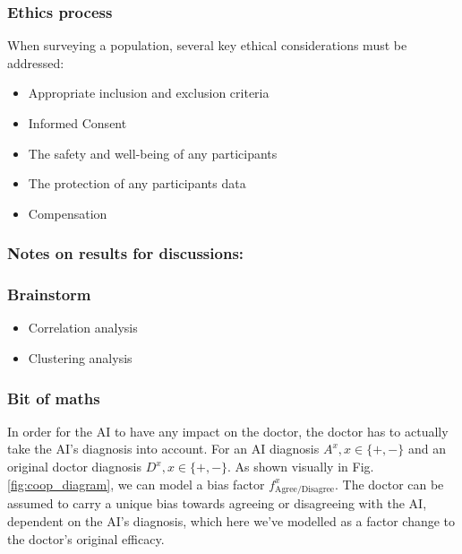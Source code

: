 \documentclass[manuscript,screen,review]{acmart}
\begin{document}
\subsubsection{Ethics process}

When surveying a population, several key ethical considerations must be addressed:
\begin{itemize}
    \item Appropriate inclusion and exclusion criteria
    \item Informed Consent
    \item The safety and well-being of any participants
    \item The protection of any participants data 
    \item Compensation
\end{itemize}
 



\subsubsection{Notes on results for discussions:}








\subsubsection{Brainstorm}
\begin{itemize}
    \item Correlation analysis
    \item Clustering analysis
\end{itemize}




\subsubsection{Bit of maths}

In order for the AI to have any impact on the doctor, the doctor has to actually take the AI's diagnosis into account. For an AI diagnosis $A^x, x\in \{+,- \}$ and an original doctor diagnosis $D^x, x\in \{+,- \}$. As shown visually in Fig. \ref{fig:coop_diagram}, we can model a bias factor $f^x_{\textrm{Agree/Disagree}}$. The doctor can be assumed to carry a unique bias towards agreeing or disagreeing with the AI, dependent on the AI's diagnosis, which here we've modelled as a factor change to the doctor's original efficacy.
\end{document}
